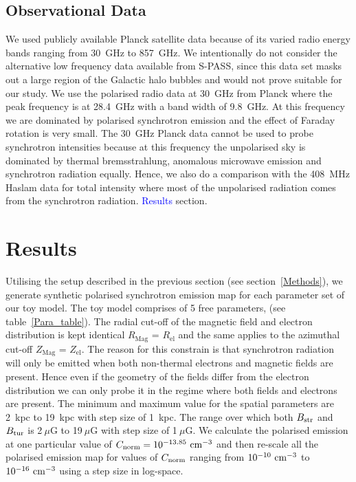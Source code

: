 \documentclass[12pt, a4 paper]{article}
\newcommand{\Vasu}[1]{{\color{purple}#1}}
\begin{document}

\subsection{Observational Data}
We used publicly available Planck satellite data because of its varied radio energy bands ranging from 30~GHz to 857~GHz. We intentionally do not consider the alternative low frequency data available from S-PASS, since this data set masks out a large region of the Galactic halo bubbles and would not prove suitable for our study. We use the polarised radio data at 30~GHz from Planck where the peak frequency is at 28.4~GHz with a band width of 9.8~GHz. At this frequency we are dominated by polarised synchrotron emission and the effect of Faraday rotation is very small. %
The 30~GHz Planck data cannot be used to probe synchrotron intensities because at this frequency the unpolarised sky is dominated by thermal bremsstrahlung, anomalous microwave emission and synchrotron radiation equally. Hence, we also do a comparison with the 408~MHz Haslam data for total intensity where most of the unpolarised radiation comes from the synchrotron radiation.
 \textcolor{blue}{Results} section.

\clearpage
\newpage
\section{Results}
\label{Results}




Utilising the setup described in the previous section (see section~\ref{Methods}), we generate synthetic polarised synchrotron emission map for each parameter set of our toy model. The toy model comprises of 5 free parameters, (see table~\ref{Para_table}). The radial cut-off of the magnetic field and electron distribution is kept identical $R_{\mathrm{Mag}}$ = $R_{\mathrm{el}}$ and the same applies to the azimuthal cut-off $Z_{\mathrm{Mag}}$ = $Z_{\mathrm{el}}$. The reason for this constrain is that synchrotron radiation will only be emitted when both non-thermal electrons and magnetic fields are present. Hence even if the geometry of the fields differ from the electron distribution we can only probe it in the regime where both fields and electrons are present. The minimum and maximum value for the spatial parameters are 2~kpc to 19~kpc with step size of 1~kpc. 
The range over which both $B_{\rm str}$ and $B_{\rm tur}$ is 2$~\mu$G to 19$~\mu$G with step size of 1$~\mu$G. We calculate the polarised emission at one particular value of $C_{\rm norm} = 10^{-13.85}~\rm cm^{\rm -3}$ and then re-scale all the polarised emission map for values of  $C_{\rm norm}$ ranging from $10^{-10}~\rm cm^{\rm -3}$ to $10^{-16}~\rm cm^{\rm -3}$ using a step size in log-space.
\end{document}
